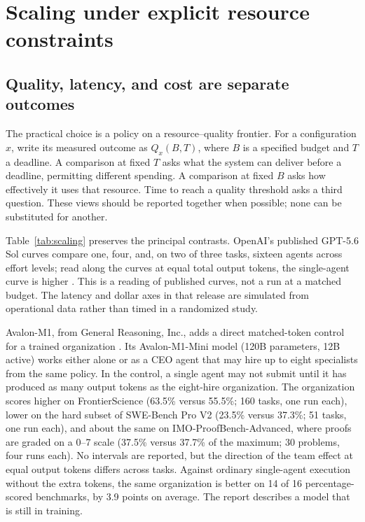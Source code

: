 \section{Scaling under explicit resource constraints}
\label{sec:scaling}
\subsection{Quality, latency, and cost are separate outcomes}
The practical choice is a policy on a resource--quality frontier. For a configuration $x$, write its measured outcome as $Q_x(B,T)$, where $B$ is a specified budget and $T$ a deadline. A comparison at fixed $T$ asks what the system can deliver before a deadline, permitting different spending. A comparison at fixed $B$ asks how effectively it uses that resource. Time to reach a quality threshold asks a third question. These views should be reported together when possible; none can be substituted for another.

Table~\ref{tab:scaling} preserves the principal contrasts. OpenAI's published GPT-5.6 Sol curves compare one, four, and, on two of three tasks, sixteen agents across effort levels; read along the curves at equal total output tokens, the single-agent curve is higher \citep{openai-gpt56-ultra,ord-swarm-scaling}. This is a reading of published curves, not a run at a matched budget. The latency and dollar axes in that release are simulated from operational data rather than timed in a randomized study.

Avalon-M1, from General Reasoning, Inc., adds a direct matched-token control for a trained organization \citep{avalon-m1}. Its Avalon-M1-Mini model (120B parameters, 12B active) works either alone or as a CEO agent that may hire up to eight specialists from the same policy. In the control, a single agent may not submit until it has produced as many output tokens as the eight-hire organization. The organization scores higher on FrontierScience (63.5\% versus 55.5\%; 160 tasks, one run each), lower on the hard subset of SWE-Bench Pro V2 (23.5\% versus 37.3\%; 51 tasks, one run each), and about the same on IMO-ProofBench-Advanced, where proofs are graded on a 0--7 scale (37.5\% versus 37.7\% of the maximum; 30 problems, four runs each). No intervals are reported, but the direction of the team effect at equal output tokens differs across tasks. Against ordinary single-agent execution without the extra tokens, the same organization is better on 14 of 16 percentage-scored benchmarks, by 3.9 points on average. The report describes a model that is still in training.

